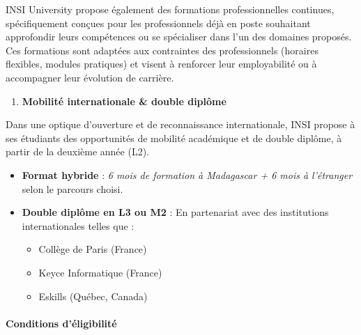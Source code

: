 INSI University propose également des formations professionnelles
continues, spécifiquement conçues pour les professionnels déjà en poste
souhaitant approfondir leurs compétences ou se spécialiser dans l'un des
domaines proposés.\\
Ces formations sont adaptées aux contraintes des professionnels
(horaires flexibles, modules pratiques) et visent à renforcer leur
employabilité ou à accompagner leur évolution de carrière.

\begin{enumerate}
	\def\labelenumi{\alph{enumi})}
	\setcounter{enumi}{3}
	\item
	\textbf{Mobilité internationale \& double diplôme}
\end{enumerate}

Dans une optique d'ouverture et de reconnaissance internationale, INSI
propose à ses étudiants des opportunités de mobilité académique et de
double diplôme, à partir de la deuxième année (L2).

\begin{itemize}
	\item
	\textbf{Format hybride} : \emph{6 mois de formation à Madagascar + 6
		mois à l'étranger} selon le parcours choisi.
\end{itemize}

\begin{itemize}
	\item
	\textbf{Double diplôme en L3 ou M2} : En partenariat avec des
	institutions internationales telles que :
	
	\begin{itemize}
		\item
		Collège de Paris (France)
	\end{itemize}
	
	\begin{itemize}
		\item
		Keyce Informatique (France)
	\end{itemize}
	
	\begin{itemize}
		\item
		Eskills (Québec, Canada)
	\end{itemize}
\end{itemize}

\hypertarget{conditions-duxe9ligibilituxe9}{%
	\paragraph{\texorpdfstring{\textbf{Conditions
				d'éligibilité}}{Conditions d'éligibilité}}\label{conditions-duxe9ligibilituxe9}}

